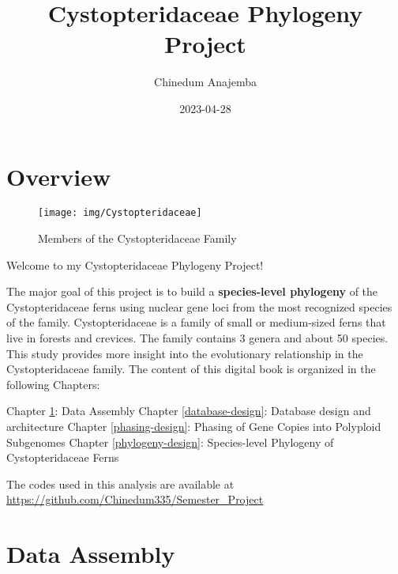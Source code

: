 \documentclass[
]{book}
\title{Cystopteridaceae Phylogeny Project}
\author{Chinedum Anajemba}
\date{2023-04-28}
\begin{document}
\maketitle

{
\setcounter{tocdepth}{1}
\tableofcontents
}
\hypertarget{overview}{%
\chapter*{Overview}\label{overview}}

\begin{figure}

{\centering \texttt{[image: img/Cystopteridaceae]} 

}

\caption{Members of the Cystopteridaceae Family}\label{fig:image1}
\end{figure}

Welcome to my Cystopteridaceae Phylogeny Project!

The major goal of this project is to build a \textbf{species-level phylogeny} of the Cystopteridaceae ferns using nuclear gene loci from the most recognized species of the family. Cystopteridaceae is a family of small or medium-sized ferns that live in forests and crevices. The family contains 3 genera and about 50 species. This study provides more insight into the evolutionary relationship in the Cystopteridaceae family.
The content of this digital book is organized in the following Chapters:

Chapter \ref{data-assembly}: Data Assembly
Chapter \ref{database-design}: Database design and architecture
Chapter \ref{phasing-design}: Phasing of Gene Copies into Polyploid Subgenomes
Chapter \ref{phylogeny-design}: Species-level Phylogeny of Cystopteridaceae Ferns

The codes used in this analysis are available at \url{https://github.com/Chinedum335/Semester_Project}

\hypertarget{data-assembly}{%
\chapter{Data Assembly}\label{data-assembly}}
\end{document}
